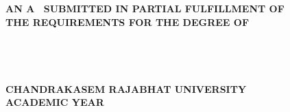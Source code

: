 %
%
%
%
{\centering
	\fontsize{16}{18.4}\selectfont
	\bfseries\expandafter\uppercase\expandafter{\@thesistitle}\\\vspace{1.427465\baselineskip}\ \\
	\fontsize{14}{16.1}\selectfont\bfseries
	\vspace{1.427465\baselineskip}
	\expandafter\uppercase\expandafter{\@author}
	\vfill
	\ifx\@typeofwriting\IndStudy AN	\else A	\fi 
	\expandafter\uppercase\expandafter{\@typeofwriting}\ SUBMITTED IN PARTIAL FULFILLMENT OF\\
	THE REQUIREMENTS FOR THE DEGREE OF\\
	\expandafter\uppercase\expandafter{\@degree}\\
	\ifdefined\@major \expandafter\uppercase\expandafter{\@major}\\ \fi
	\ifdefined\@department \expandafter\uppercase\expandafter{\@department}\\ \fi
	\expandafter\uppercase\expandafter{\@faculty}\\
	CHANDRAKASEM RAJABHAT UNIVERSITY\\
	ACADEMIC YEAR \advance{} \the\year
	\par}


